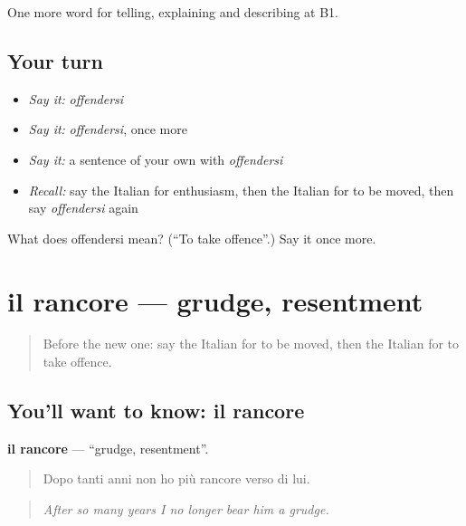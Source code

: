 \begin{grammarlens}[title={What you've built}]
One more word for telling, explaining and describing at B1.
\end{grammarlens}

\subsection*{Your turn}
\begin{itemize}
\raggedright
  \item \emph{Say it:} \emph{offendersi}
  \item \emph{Say it:} \emph{offendersi}, once more
  \item \emph{Say it:} a sentence of your own with \emph{offendersi}
  \item \emph{Recall:} say the Italian for enthusiasm, then the Italian for to be moved, then say \emph{offendersi} again
\end{itemize}

\begin{tcolorbox}[breakable,colback=teal!4,colframe=teal!35!black,title={Before you move on}]
What does offendersi mean? (\textquotedblleft{}To take offence\textquotedblright{}.) Say it once more.
\end{tcolorbox}
\section[il rancore]{il rancore — grudge, resentment}

\label{lesson:IT-C480-rancore}



\begin{quote}
Before the new one: say the Italian for to be moved, then the Italian for to take offence.
\end{quote}

\subsection*{You'll want to know: il rancore}
\textbf{il rancore} — \textquotedblleft{}grudge, resentment\textquotedblright{}.

\begin{quote}
Dopo tanti anni non ho più rancore verso di lui.
\end{quote}

\begin{quote}
\emph{After so many years I no longer bear him a grudge.}
\end{quote}

